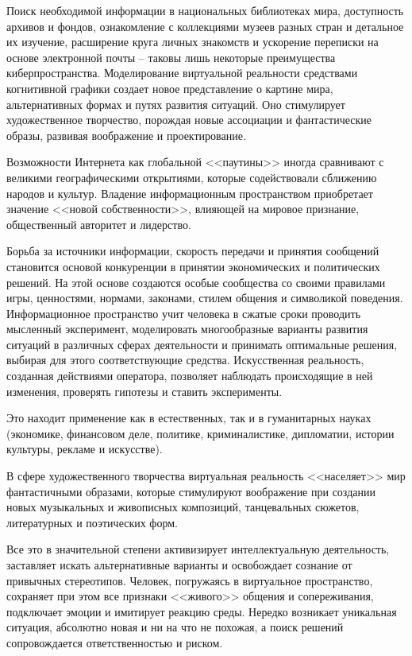   Поиск необходимой информации в национальных библиотеках мира, доступность
  архивов и фондов, ознакомление с коллекциями музеев разных стран и детальное
  их изучение, расширение круга личных знакомств и ускорение переписки на
  основе электронной почты – таковы лишь некоторые преимущества
  киберпространства. Моделирование виртуальной реальности средствами
  когнитивной графики создает новое представление о картине мира,
  альтернативных формах и путях развития ситуаций. Оно стимулирует
  художественное творчество, порождая новые ассоциации и фантастические образы,
  развивая воображение и проектирование.
  
  Возможности Интернета как глобальной <<паутины>> иногда сравнивают с великими
  географическими открытиями, которые содействовали сближению народов и
  культур. Владение информационным пространством приобретает значение <<новой
  собственности>>, влияющей на мировое признание, общественный авторитет и
  лидерство.
  
  Борьба за источники информации, скорость передачи и принятия сообщений
  становится основой конкуренции в принятии экономических и политических
  решений. На этой основе создаются особые сообщества со своими правилами игры,
  ценностями, нормами, законами, стилем общения и символикой поведения.
  Информационное пространство учит человека в сжатые сроки проводить мысленный
  эксперимент, моделировать многообразные варианты развития ситуаций в
  различных сферах деятельности и принимать оптимальные решения, выбирая для
  этого соответствующие средства. Искусственная реальность, созданная
  действиями оператора, позволяет наблюдать происходящие в ней изменения,
  проверять гипотезы и ставить эксперименты.
  
  Это находит применение как в естественных, так и в гуманитарных науках
  (экономике, финансовом деле, политике, криминалистике, дипломатии, истории
  культуры, рекламе и искусстве).
  
  В сфере художественного творчества виртуальная реальность <<населяет>> мир
  фантастичными образами, которые стимулируют воображение при создании новых
  музыкальных и живописных композиций, танцевальных сюжетов, литературных и
  поэтических форм.
  
  Все это в значительной степени активизирует интеллектуальную деятельность,
  заставляет искать альтернативные варианты и освобождает сознание от привычных
  стереотипов. Человек, погружаясь в виртуальное пространство, сохраняет при
  этом все признаки <<живого>> общения и сопереживания, подключает эмоции и
  имитирует реакцию среды. Нередко возникает уникальная ситуация, абсолютно
  новая и ни на что не похожая, а поиск решений сопровождается ответственностью
  и риском.
  
